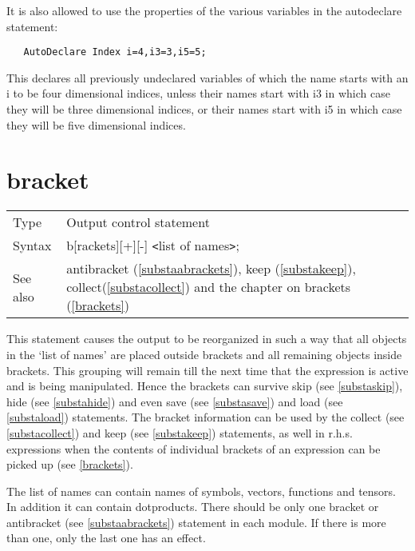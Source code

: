 \noindent It is also allowed to use the properties of the various variables 
in the autodeclare statement:
\begin{verbatim}
   AutoDeclare Index i=4,i3=3,i5=5;
\end{verbatim}
This declares all previously undeclared variables of which the name starts 
with an i to be four dimensional indices, unless their names start with i3 in 
which case they will be three dimensional indices, or their names start 
with i5 in which case they will be five dimensional indices. \vspace{10mm}


\section{bracket}
\label{substabracket}

\noindent \begin{tabular}{ll}
Type & Output control statement\\
Syntax & b[rackets][+][-] {\tt<}list of names{\tt>}; \\
See also & antibracket (\ref{substaabrackets}), keep (\ref{substakeep}),
    collect(\ref{substacollect}) and the chapter on brackets 
     (\ref{brackets})
\end{tabular} \vspace{4mm}

\noindent This statement causes the output to be reorganized in such a way 
that all objects in the `list of names' are placed outside 
brackets and all remaining objects inside 
brackets. This grouping will remain till the next time that 
the expression is active and is being manipulated. Hence the brackets can 
survive skip (see \ref{substaskip}), hide (see \ref{substahide}) and even 
save (see \ref{substasave}) and load (see \ref{substaload}) statements. The 
bracket information can be used by the collect (see \ref{substacollect}) 
and keep (see \ref{substakeep}) statements, as well in r.h.s. expressions 
when the contents of individual brackets of an expression can be picked up 
(see \ref{brackets}). \vspace{4mm}

\noindent The list of names can contain names of symbols, vectors, 
functions and tensors. In addition it can contain dotproducts. There should 
be only one bracket or antibracket (see \ref{substaabrackets}) statement 
in each module. If there is more than one, only the last one has an effect. 
\vspace{4mm}

